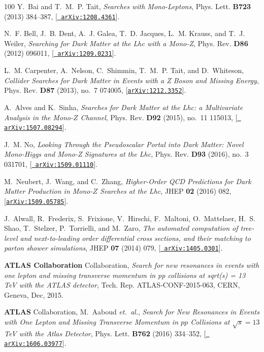 \documentclass[11pt]{article}
\renewcommand{\[}{\begin{equation}}
\renewcommand{\]}{\end{equation}}
\begin{document}
\begin{thebibliography}{100}
Y.~Bai and T.~M.~P. Tait, {\it {Searches with Mono-Leptons}},  Phys. Lett. {\bf
  B723} (2013) 384--387, [\href{http://xxx.lanl.gov/abs/1208.4361}{{\tt
  arXiv:1208.4361}}].

N.~F. Bell, J.~B. Dent, A.~J. Galea, T.~D. Jacques, L.~M. Krauss, and T.~J.
  Weiler, {\it {Searching for Dark Matter at the Lhc with a Mono-Z}},  Phys.
  Rev. {\bf D86} (2012) 096011, [\href{http://xxx.lanl.gov/abs/1209.0231}{{\tt
  arXiv:1209.0231}}].

L.~M. Carpenter, A.~Nelson, C.~Shimmin, T.~M.~P. Tait, and D.~Whiteson, {\it
  {Collider Searches for Dark Matter in Events with a Z Boson and Missing
  Energy}},  Phys. Rev. {\bf D87} (2013), no.~7 074005,
  [\href{http://xxx.lanl.gov/abs/1212.3352}{{\tt arXiv:1212.3352}}].

A.~Alves and K.~Sinha, {\it {Searches for Dark Matter at the Lhc: a
  Multivariate Analysis in the Mono-$Z$ Channel}},  Phys. Rev. {\bf D92}
  (2015), no.~11 115013, [\href{http://xxx.lanl.gov/abs/1507.08294}{{\tt
  arXiv:1507.08294}}].

J.~M. No, {\it {Looking Through the Pseudoscalar Portal into Dark Matter: Novel
  Mono-Higgs and Mono-Z Signatures at the Lhc}},  Phys. Rev. {\bf D93} (2016),
  no.~3 031701, [\href{http://xxx.lanl.gov/abs/1509.01110}{{\tt
  arXiv:1509.01110}}].

M.~Neubert, J.~Wang, and C.~Zhang, {\it {Higher-Order QCD Predictions for Dark
  Matter Production in Mono-$Z$ Searches at the Lhc}},  JHEP {\bf 02} (2016)
  082, [\href{http://xxx.lanl.gov/abs/1509.05785}{{\tt arXiv:1509.05785}}].

J.~Alwall, R.~Frederix, S.~Frixione, V.~Hirschi, F.~Maltoni, O.~Mattelaer,
  H.~S. Shao, T.~Stelzer, P.~Torrielli, and M.~Zaro, {\it {The automated
  computation of tree-level and next-to-leading order differential cross
  sections, and their matching to parton shower simulations}},  JHEP {\bf 07}
  (2014) 079, [\href{http://xxx.lanl.gov/abs/1405.0301}{{\tt
  arXiv:1405.0301}}].

{\bf ATLAS Collaboration} Collaboration, {\it {Search for new resonances in
  events with one lepton and missing transverse momentum in pp collisions at
  sqrt(s) = 13 TeV with the ATLAS detector}},  Tech. Rep. ATLAS-CONF-2015-063,
  CERN, Geneva, Dec, 2015.

{\bf ATLAS} Collaboration, M.~Aaboud {\em et.~al.}, {\it {Search for New
  Resonances in Events with One Lepton and Missing Transverse Momentum in $pp$
  Collisions at $\sqrt{s} = 13$ TeV with the Atlas Detector}},  Phys. Lett.
  {\bf B762} (2016) 334--352, [\href{http://xxx.lanl.gov/abs/1606.03977}{{\tt
  arXiv:1606.03977}}].


\end{thebibliography}
\end{document}
